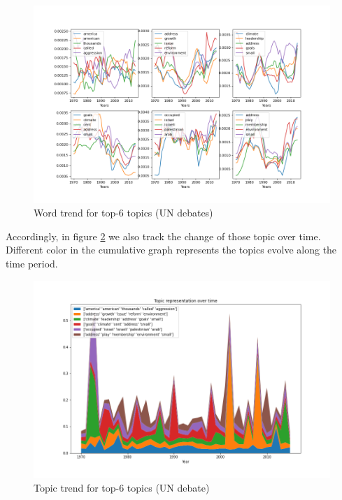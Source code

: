 \begin{figure}[h]
\centering
\includegraphics[width=0.9\linewidth]{figures/1220/scatter}
\caption{Word trend for top-6 topics (UN debates)}
\label{fig:scatter}
\end{figure}
Accordingly, in figure \ref{fig:stack} we also track the change of those topic over time. Different color in the cumulative graph represents the topics evolve along the time period. \\
\begin{figure}[h]
\centering
\includegraphics[width=0.9\linewidth]{figures/1220/stack}
\caption{Topic trend for top-6 topics (UN debate)}
\label{fig:stack}
\end{figure}
